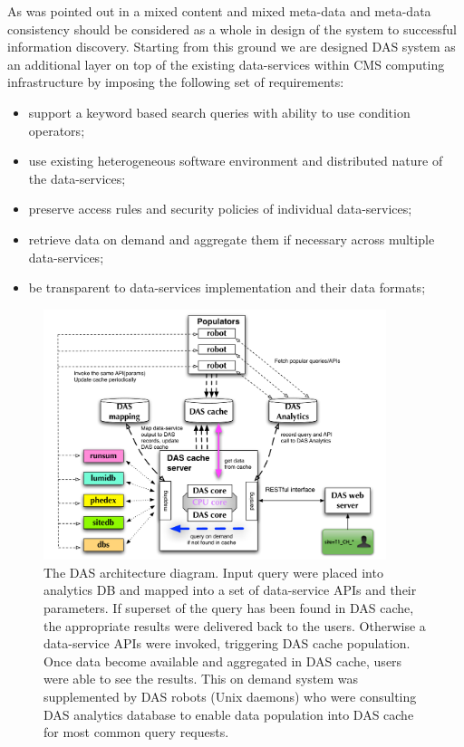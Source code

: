 \documentclass[1p,times]{elsarticle}
\begin{document}
As was pointed out in \cite{Arms} a mixed content and 
mixed meta-data and meta-data consistency should be considered as a whole in design 
of the system to successful information discovery. 
Starting from this ground we are designed DAS system as an
additional layer on top of the existing data-services
within CMS computing infrastructure by imposing the following set of requirements:
\begin{itemize}
\item support a keyword based search queries with ability to use condition operators;
\item use existing heterogeneous software environment and distributed nature of the data-services;
\item preserve access rules and security policies of individual data-services;
\item retrieve data on demand and aggregate them if necessary across
multiple data-services;
\item be transparent to data-services implementation and their data formats;
\end{itemize}
\begin{figure}[htb]
\centering
\includegraphics[width=100mm]{DAS_Cache_and_Analytics.pdf}
\caption{
The DAS architecture diagram. 
Input query were placed into analytics DB and mapped into a set of
data-service APIs and their parameters. If superset of the query has been
found in DAS cache, the appropriate results were delivered back to the users.
Otherwise a data-service APIs were invoked, triggering DAS cache population. 
Once data become available and aggregated in DAS cache, users were able 
to see the results. This on demand system was supplemented by DAS robots 
(Unix daemons) who were consulting DAS analytics database to enable data 
population into DAS cache for most common query requests.
}
\label{DAS_cache}
\end{figure}
\end{document}
